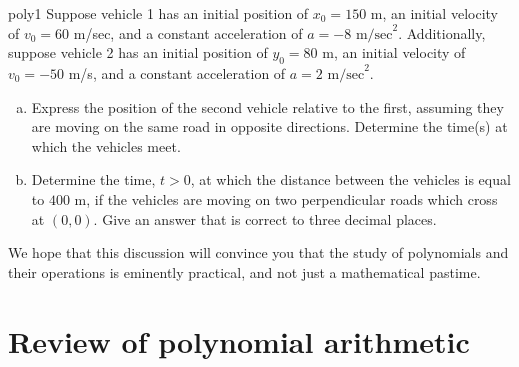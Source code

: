                                    
\begin{exercise}{poly1}
Suppose vehicle 1 has an initial position of $x_0=150$ m, an initial velocity of $v_0=60$  m/sec, and a constant acceleration of $a=-8$ $\text{m/sec}^2$. Additionally, suppose vehicle 2 has an initial position of $y_0=80$ $\text{m}$, an initial velocity of $ v_0=-50$  m/s, and a constant acceleration of $a=2$ $\text{m/sec}^2$.
\begin{enumerate}[(a)]
\item
Express the position of the second vehicle relative to the first, assuming they are moving on the same road in opposite directions. Determine the time(s) at which the vehicles meet.
\item
Determine the time, $t>0$, at which the distance between the vehicles is equal to $400$ $\text{m}$, if the vehicles are moving on two perpendicular roads which cross at $(0, 0)$. Give an answer that is correct to three decimal places.
\end{enumerate}
\end{exercise}

We hope that this discussion will convince you that the study of polynomials and their operations is eminently practical, and not just a mathematical pastime.

\section{Review of polynomial arithmetic\quad
{}}\label{sec:polyStripe}


